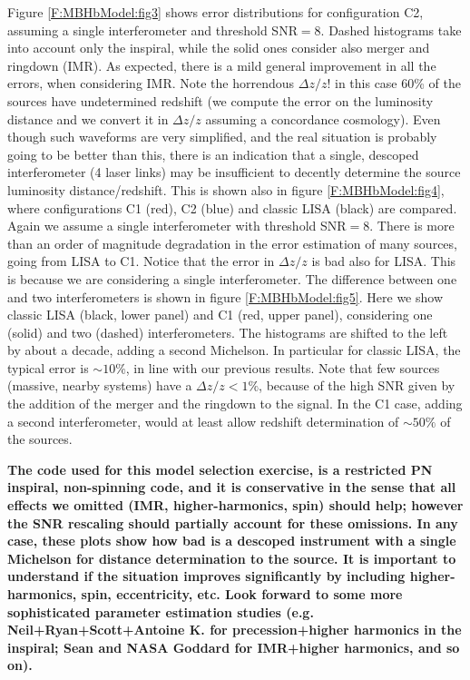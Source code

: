 \documentclass{iopart}
\begin{document}
Figure \ref{F:MBHbModel:fig3} shows error distributions for configuration C2, assuming a single interferometer and threshold SNR$=8$. Dashed histograms take into account only the inspiral, while the solid ones consider also merger and ringdown (IMR). As expected, there is a mild general improvement in all the errors, when considering IMR. Note the horrendous $\Delta{z}/z$! in this case 60\% of the sources have undetermined redshift (we compute the error on the luminosity distance and we convert it in $\Delta{z}/z$ assuming a concordance cosmology). Even though such waveforms are very simplified, and the real situation is probably going to be better than this, there is an indication that a single, descoped interferometer (4 laser links) may be insufficient to decently determine the source luminosity distance/redshift. This is shown also in figure \ref{F:MBHbModel:fig4}, where configurations C1 (red), C2 (blue) and classic LISA (black) are compared. Again we assume a single interferometer with threshold SNR$=8$. There is more than an order of magnitude degradation in the error estimation of many sources, going from LISA to C1. Notice that the error in $\Delta{z}/z$ is bad also for LISA. This is because we are considering a single interferometer. The difference between one and two interferometers is shown in figure \ref{F:MBHbModel:fig5}. Here we show classic LISA (black, lower panel) and C1 (red, upper panel), considering one (solid) and two (dashed) interferometers. The histograms are shifted to the left by about a decade, adding a second Michelson. In particular for classic LISA, the typical error is $\sim10\%$, in line with our previous results. Note that few sources (massive, nearby systems) have a $\Delta{z}/z<1\%$, because of the high SNR given by the addition of the merger and the ringdown to the signal. In the C1 case, adding a second interferometer, would at least allow redshift determination of $\sim 50\%$ of the sources. 

{\bf The code used for this model selection exercise, is a
restricted PN inspiral, non-spinning code, and it is conservative in the
sense that all effects we omitted (IMR, higher-harmonics, spin) should
help; however the SNR rescaling should partially account for these
omissions. In any case, these plots show how bad is a descoped instrument 
with a single Michelson for distance determination to the source. 
It is important to understand if the situation improves significantly
by including higher-harmonics, spin, eccentricity, etc. 
Look forward to some more sophisticated parameter estimation studies
(e.g. Neil+Ryan+Scott+Antoine K. for precession+higher harmonics in the inspiral; 
Sean and NASA Goddard for IMR+higher harmonics, and so on).}
\end{document}
